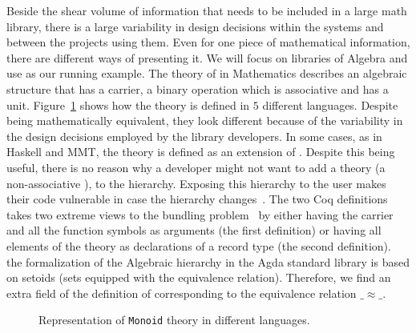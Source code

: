 Beside the shear volume of information that needs to be included in a large math library, there is a large variability in design decisions within the systems and between the projects using them. 
Even for one piece of mathematical information, there are different ways of presenting it. We will focus on libraries of Algebra and use  as our running example. The theory of  in Mathematics describes an algebraic structure that has a carrier, a binary operation which is associative and has a unit. 
Figure~\ref{fig:mon-diff-lang} shows how the  theory is defined in $5$ different languages. Despite being mathematically equivalent, they look different because of the variability in the design decisions employed by the library developers.  
In some cases, as in Haskell and MMT, the theory \monoid is defined as an extension of \semigroup. Despite this being useful, there is no reason why a developer might not want to add a theory \unital (a non-associative \monoid), to the hierarchy. Exposing this hierarchy to the user makes their code vulnerable in case the hierarchy changes~\cite{wiki:haskell_hierarch, cohen2020hierarchy}. 
The two Coq definitions takes two extreme views to the bundling problem~\cite{lean2019,alhassy2019,spitters2011type} by either having the carrier and all the function symbols as arguments (the first definition) or having all elements of the theory as declarations of a record type (the second definition). the formalization of the Algebraic hierarchy in the Agda standard library is based on setoids (sets equipped with the equivalence relation). Therefore, we find an extra field of the definition of \monoid corresponding to the equivalence relation $\_\approx\_$. 
\begin{figure}
    
    \caption{Representation of \lstinline|Monoid| theory in different languages.}
    \label{fig:mon-diff-lang}
\end{figure}

